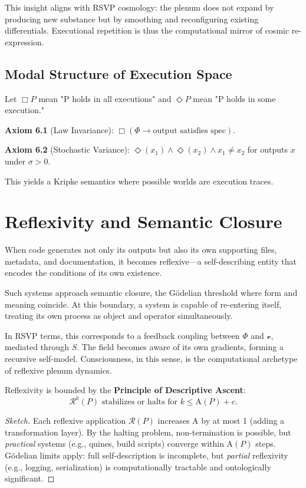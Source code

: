 \documentclass[12pt,a4paper]{article}
\theoremstyle{plain}
\theoremstyle{definition}
\theoremstyle{remark}
\newcommand{\Phifield}{\Phi}
\newcommand{\vfield}{\mathcal{v}}
\newcommand{\Sfield}{S}
\newcommand{\AI}{\mathrm{A}}
\begin{document}
This insight aligns with RSVP cosmology: the plenum does not expand by producing new substance but by smoothing and reconfiguring existing differentials. Executional repetition is thus the computational mirror of cosmic re-expression.

\subsection{Modal Structure of Execution Space}
Let $\Box P$ mean "P holds in all executions" and $\Diamond P$ mean "P holds in some execution."

\textbf{Axiom 6.1} (Law Invariance): $\Box(\Phifield \to \text{output satisfies spec})$.

\textbf{Axiom 6.2} (Stochastic Variance): $\Diamond(x_1) \land \Diamond(x_2) \land x_1 \neq x_2$ for outputs $x$ under $\sigma > 0$.

This yields a Kripke semantics where possible worlds are execution traces.

\section{Reflexivity and Semantic Closure}
\label{sec:reflexivity}

When code generates not only its outputs but also its own supporting files, metadata, and documentation, it becomes reflexive—a self-describing entity that encodes the conditions of its own existence.

Such systems approach semantic closure, the Gödelian threshold where form and meaning coincide. At this boundary, a system is capable of re-entering itself, treating its own process as object and operator simultaneously.

In RSVP terms, this corresponds to a feedback coupling between $\Phifield$ and $\vfield$, mediated through $\Sfield$. The field becomes aware of its own gradients, forming a recursive self-model. Consciousness, in this sense, is the computational archetype of reflexive plenum dynamics.

Reflexivity is bounded by the \textbf{Principle of Descriptive Ascent}:
\[
\mathcal{R}^k(P) \text{ stabilizes or halts for } k \leq \AI(P) + c.
\]

\begin{proof}[Sketch]
Each reflexive application $\mathcal{R}(P)$ increases $\AI$ by at most 1 (adding a transformation layer). By the halting problem, non-termination is possible, but \emph{practical} systems (e.g., quines, build scripts) converge within $\AI(P)$ steps. Gödelian limits apply: full self-description is incomplete, but \emph{partial} reflexivity (e.g., logging, serialization) is computationally tractable and ontologically significant.
\end{proof}
\end{document}
